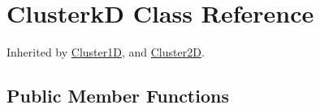 \hypertarget{classdynamicfilterapp_1_1simulation__files_1_1cluster_1_1_clusterk_d}{}\section{ClusterkD Class Reference}
\label{classdynamicfilterapp_1_1simulation__files_1_1cluster_1_1_clusterk_d}


Inherited by \hyperlink{classdynamicfilterapp_1_1simulation__files_1_1cluster_1_1_cluster1_d}{Cluster1D}, and \hyperlink{classdynamicfilterapp_1_1simulation__files_1_1cluster_1_1_cluster2_d}{Cluster2D}.

\subsection*{Public Member Functions}
